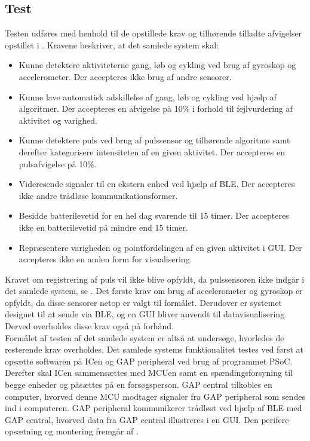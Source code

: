 \subsection{Test}
Testen udføres med henhold til de opstillede krav og tilhørende tilladte afvigelser opstillet i . Kravene beskriver, at det samlede system skal:
\begin{itemize}
	\item Kunne detektere aktiviteterne gang, løb og cykling ved brug af gyroskop og accelerometer. Der accepteres ikke brug af andre sensorer.
	\item Kunne lave automatisk adskillelse af gang, løb og cykling ved hjælp af algoritmer. Der accepteres en afvigelse på 10\% i forhold til fejlvurdering af aktivitet og varighed.
	\item Kunne detektere puls ved brug af pulssensor og tilhørende algoritme samt derefter kategorisere intensiteten af en given aktivitet. Der accepteres en pulsafvigelse på 10\%.
	\item Videresende signaler til en ekstern enhed ved hjælp af BLE. Der accepteres ikke andre trådløse kommunikationsformer.
	\item Besidde batterilevetid for en hel dag svarende til 15 timer. Der accepteres ikke en batterilevetid på mindre end 15 timer.
	\item Repræsentere varigheden og pointfordelingen af en given aktivitet i GUI. Der accepteres ikke en anden form for visualisering. 
\end{itemize}
Kravet om registrering af puls vil ikke blive opfyldt, da pulssensoren ikke indgår i det samlede system, se . Det første krav om brug af accelerometer og gyroskop er opfyldt, da disse sensorer netop er valgt til formålet. Derudover er systemet designet til at sende via BLE, og en GUI bliver anvendt til datavisualisering. Derved overholdes disse krav også på forhånd. \\
Formålet af testen af det samlede system er altså at undersøge, hvorledes de resterende krav overholdes. Det samlede systems funktionalitet testes ved først at opsætte softwaren på ICen og GAP peripheral ved brug af programmet PSoC. Derefter skal ICen sammensættes med MCUen samt en spændingsforsyning til begge enheder og påsættes på en forsøgsperson. GAP central tilkobles en computer, hvorved denne MCU modtager signaler fra GAP peripheral som sendes ind i computeren. GAP peripheral kommunikerer trådløst ved hjælp af BLE med GAP central, hvorved data fra GAP central illustreres i en GUI. Den perifere opsætning og montering fremgår af .
